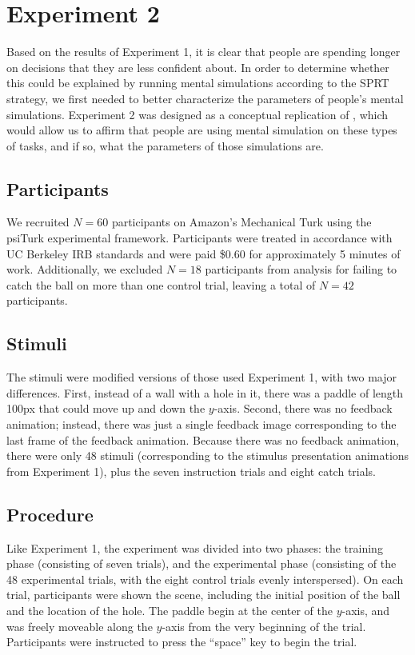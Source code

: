 \documentclass[10pt,letterpaper]{article}
\begin{document}
\section{Experiment 2}

Based on the results of Experiment 1, it is clear that people are spending longer on decisions that they are less confident about. In order to determine whether this could be explained by running mental simulations according to the SPRT strategy, we first needed to better characterize the parameters of people's mental simulations. Experiment 2 was designed as a conceptual replication of , which would allow us to affirm that people are using mental simulation on these types of tasks, and if so, what the parameters of those simulations are.

\subsection{Participants}

We recruited $N=60$ participants on Amazon's Mechanical Turk using the psiTurk \cite{McDonnell12} experimental framework. Participants were treated in accordance with UC Berkeley IRB standards and were paid \$0.60 for approximately 5 minutes of work. Additionally, we excluded $N=18$ participants from analysis for failing to catch the ball on more than one control trial, leaving a total of $N=42$ participants.

\subsection{Stimuli}

The stimuli were modified versions of those used Experiment 1, with two major differences. First, instead of a wall with a hole in it, there was a paddle of length 100px that could move up and down the $y$-axis. Second, there was no feedback animation; instead, there was just a single feedback image corresponding to the last frame of the feedback animation. Because there was no feedback animation, there were only 48 stimuli (corresponding to the stimulus presentation animations from Experiment 1), plus the seven instruction trials and eight catch trials.

\subsection{Procedure}

Like Experiment 1, the experiment was divided into two phases: the training phase (consisting of seven trials), and the experimental phase (consisting of the 48 experimental trials, with the eight control trials evenly interspersed). On each trial, participants were shown the scene, including the initial position of the ball and the location of the hole. The paddle begin at the center of the $y$-axis, and was freely moveable along the $y$-axis from the very beginning of the trial. Participants were instructed to press the ``space'' key to begin the trial. 
\end{document}

